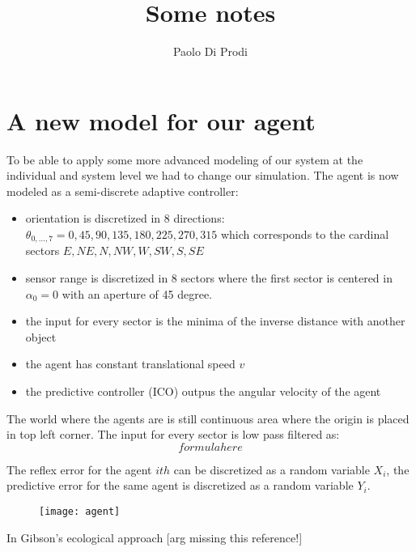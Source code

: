 \documentclass[a4paper,10pt]{article}
\title{Some notes}
\author{Paolo Di Prodi}
\begin{document}
\maketitle

\begin{abstract}

\end{abstract}







\section{A new model for our agent}
To be able to apply some more advanced modeling of our system at the individual and system level we had to change our simulation.
The agent is now modeled as a semi-discrete adaptive controller:
\begin{itemize}
 \item orientation is discretized in 8 directions: $\theta_{0,...,7}={0,45,90,135,180,225,270,315}$ which corresponds to the cardinal sectors $E,NE,N,NW,W,SW,S,SE$
 \item sensor range is discretized in 8 sectors where the first sector is centered in $\alpha_0=0$ with an aperture of 45 degree.
 \item the input for every sector is the minima of the inverse distance with another object
 \item the agent has  constant translational speed $v$
 \item the predictive controller (ICO) outpus the angular velocity of the agent
\end{itemize}
The world where the agents are is still continuous area where the origin is placed in top left corner.
The input for every sector is low pass filtered as:
\begin{equation}
 formula here
\end{equation}

The reflex error for the agent $ith$ can be discretized as a random variable $X_i$, the predictive error for the same agent is discretized as a random variable $Y_i$.
\begin{figure}[!htbp]
\texttt{[image: agent]}
\caption{}
\end{figure} 
In Gibson's ecological approach [arg missing this reference!]





%



\end{document}
